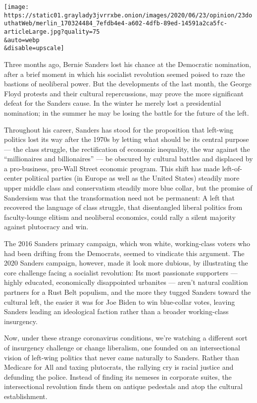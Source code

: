 \texttt{[image: https://static01.graylady3jvrrxbe.onion/images/2020/06/23/opinion/23douthatWeb/merlin\_170324484\_7efdb4e4-a602-4dfb-89ed-14591a2ca5fc-articleLarge.jpg?quality=75\\\&auto=webp\\\&disable=upscale]}

Three months ago, Bernie Sanders lost his chance at the Democratic
nomination, after a brief moment in which his socialist revolution
seemed poised to raze the bastions of neoliberal power. But the
developments of the last month, the George Floyd protests and their
cultural repercussions, may prove the more significant defeat for the
Sanders cause. In the winter he merely lost a presidential nomination;
in the summer he may be losing the battle for the future of the left.

Throughout his career, Sanders has stood for the proposition that
left-wing politics lost its way after the 1970s by letting what should
be its central purpose --- the class struggle, the rectification of
economic inequality, the war against the ``millionaires and
billionaires'' --- be obscured by cultural battles and displaced by a
pro-business, pro-Wall Street economic program. This shift has made
left-of-center political parties (in Europe as well as the United
States) steadily more upper middle class and conservatism steadily more
blue collar, but the promise of Sandersism was that the transformation
need not be permanent: A left that recovered the language of class
struggle, that disentangled liberal politics from faculty-lounge elitism
and neoliberal economics, could rally a silent majority against
plutocracy and win.

The 2016 Sanders primary campaign, which won white, working-class voters
who had been drifting from the Democrats, seemed to vindicate this
argument. The 2020 Sanders campaign, however, made it look more dubious,
by illustrating the core challenge facing a socialist revolution: Its
most passionate supporters --- highly educated, economically
disappointed urbanites --- aren't natural coalition partners for a Rust
Belt populism, and the more they tugged Sanders toward the cultural
left, the easier it was for Joe Biden to win blue-collar votes, leaving
Sanders leading an ideological faction rather than a broader
working-class insurgency.

Now, under these strange coronavirus conditions, we're watching a
different sort of insurgency challenge or change liberalism, one founded
on an intersectional vision of left-wing politics that never came
naturally to Sanders. Rather than Medicare for All and taxing
plutocrats, the rallying cry is racial justice and defunding the police.
Instead of finding its nemeses in corporate suites, the intersectional
revolution finds them on antique pedestals and atop the cultural
establishment.

